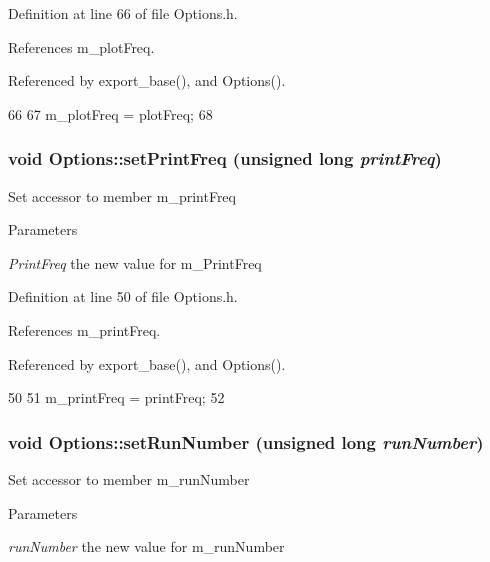 Definition at line 66 of file Options.h.

References m\_\-plotFreq.

Referenced by export\_\-base(), and Options().


\begin{DoxyCode}
66                                                   {
67                 m_plotFreq = plotFreq;
68         }
\end{DoxyCode}
\hypertarget{classOptions_adac15a8dbae0183ae7cecc09ebba6887}{
\subsubsection[{setPrintFreq}]{\setlength{\rightskip}{0pt plus 5cm}void Options::setPrintFreq (unsigned long {\em printFreq})}}
\label{classOptions_adac15a8dbae0183ae7cecc09ebba6887}
Set accessor to member m\_\-printFreq 
\begin{DoxyParams}{Parameters}
\item[{\em PrintFreq}]the new value for m\_\-PrintFreq \end{DoxyParams}


Definition at line 50 of file Options.h.

References m\_\-printFreq.

Referenced by export\_\-base(), and Options().


\begin{DoxyCode}
50                                                     {
51                 m_printFreq = printFreq;
52         }
\end{DoxyCode}
\hypertarget{classOptions_aed19a55eb2c418f333bc97615cf4a3a8}{
\subsubsection[{setRunNumber}]{\setlength{\rightskip}{0pt plus 5cm}void Options::setRunNumber (unsigned long {\em runNumber})}}
\label{classOptions_aed19a55eb2c418f333bc97615cf4a3a8}
Set accessor to member m\_\-runNumber 
\begin{DoxyParams}{Parameters}
\item[{\em runNumber}]the new value for m\_\-runNumber \end{DoxyParams}


